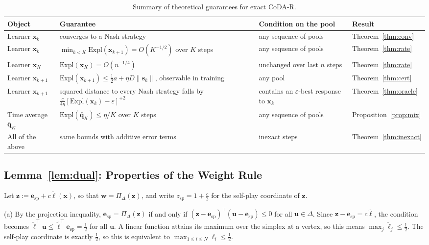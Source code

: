 \documentclass{article} %
\theoremstyle{plain}
\theoremstyle{remark}
\newcommand{\Expl}{\mathrm{Expl}}
\newcommand{\Proj}{\Pi}
\newcommand{\simplex}{\Delta}
\newcommand{\bx}{{\bm{x}}}
\newcommand{\bw}{{\bm{w}}}
\newcommand{\bz}{{\bm{z}}}
\newcommand{\bu}{{\bm{u}}}
\newcommand{\bq}{{\bm{q}}}
\newcommand{\be}{{\bm{e}}}
\newcommand{\bell}{{\bm{\ell}}}
\newcommand{\aug}{\tilde{\bell}}
\newcommand{\dx}{{\bm{s}}}
\newcommand{\esp}{\be_{\mathrm{sp}}}
\newcommand{\codar}{CoDA-R}
\begin{document}
\begin{table}[!htbp]
\caption{Summary of theoretical guarantees for exact \codar{}.}
\label{tab:guarantees}
\begin{center}
\footnotesize
\setlength{\tabcolsep}{3.5pt}
\begin{tabular}{p{2.1cm}p{5.2cm}p{3.3cm}l}
\toprule
Object & Guarantee & Condition on the pool & Result \\
\midrule
Learner $\bx_k$ & converges to a Nash strategy & any sequence of pools & Theorem~\ref{thm:conv} \\
Learner $\bx_k$ & $\min_{k<K}\Expl(\bx_{k+1})=O(K^{-1/2})$ over $K$ steps & any sequence of pools & Theorem~\ref{thm:rate} \\
Learner $\bx_K$ & $\Expl(\bx_K)=O(n^{-1/4})$ & unchanged over last $n$ steps & Theorem~\ref{thm:rate} \\
Learner $\bx_{k+1}$ & $\Expl(\bx_{k+1})\le\tfrac12a+\eta D\|\dx_k\|$, observable in training & any pool & Theorem~\ref{thm:cert} \\
Learner $\bx_{k+1}$ & squared distance to every Nash strategy falls by $\tfrac{c}{4\eta}[\Expl(\bx_k)-\varepsilon]^{+2}$ & contains an $\varepsilon$-best response to $\bx_k$ & Theorem~\ref{thm:oracle} \\
Time average $\bar{\bq}_K$ & $\Expl(\bar{\bq}_K)\le\eta/K$ over $K$ steps & any sequence of pools & Proposition~\ref{prop:mix} \\
All of the above & same bounds with additive error terms & inexact steps & Theorem~\ref{thm:inexact} \\
\bottomrule
\end{tabular}
\end{center}
\end{table}

\subsection{Lemma~\ref{lem:dual}: Properties of the Weight Rule}
\label{app:dual}

Let $\bz:=\esp+c\aug(\bx)$, so that $\bw=\Proj_\simplex(\bz)$, and write $z_{\mathrm{sp}}=1+\tfrac c2$ for the self-play coordinate of $\bz$.

(a) By the projection inequality, $\esp=\Proj_\simplex(\bz)$ if and only if $(\bz-\esp)^\top(\bu-\esp)\le0$ for all $\bu\in\simplex$. Since $\bz-\esp=c\aug$, the condition becomes $\aug^\top \bu\le\aug^\top \esp=\tfrac12$ for all $\bu$. A linear function attains its maximum over the simplex at a vertex, so this means $\max_j\tilde\ell_j\le\tfrac12$. The self-play coordinate is exactly $\tfrac12$, so this is equivalent to $\max_{1\le i\le N}\ell_i\le\tfrac12$.
\end{document}
